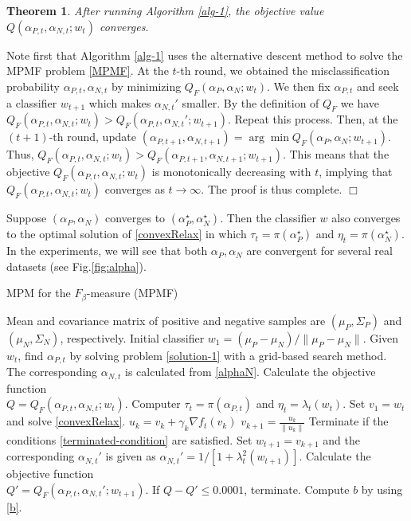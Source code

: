 \documentclass[15pt]{article}
\newtheorem{theorem}{Theorem}
\newenvironment{proof}{{\em Proof.}}{$\Box$}
\begin{document}
\begin{theorem}\label{the:covmpmf}
After running Algorithm \ref{alg-1}, the objective value $Q(\alpha_{P,t},\alpha_{N,t};w_t)$ converges.
\end{theorem}

\begin{proof}
Note first that Algorithm \ref{alg-1} uses the alternative descent method to solve the MPMF problem \eqref{MPMF}.
At the $t$-th round, we obtained the misclassification probability $\alpha_{P,t},\alpha_{N,t}$
by minimizing $Q_F(\alpha_{P},\alpha_{N};w_t)$. We then fix $\alpha_{P,t}$ and seek a classifier $w_{t+1}$
which makes $\alpha_{N,t}'$ smaller. By the definition of $Q_F$ we have
$Q_F(\alpha_{P,t},\alpha_{N,t};w_t)>Q_F(\alpha_{P,t},\alpha_{N,t}'; w_{t+1})$.
Repeat this process. Then, at the $(t+1)$-th round, update
$(\alpha_{P,t+1},\alpha_{N,t+1})=\arg\min Q_F(\alpha_{P},\alpha_{N};w_{t+1})$.
Thus, $Q_F(\alpha_{P,t},\alpha_{N,t};w_t)>Q_F(\alpha_{P,t+1},\alpha_{N,t+1};w_{t+1})$.
This means that the objective $Q_F(\alpha_{P,t},\alpha_{N,t};w_t)$ is monotonically decreasing with $t$,
implying that $Q_F(\alpha_{P,t},\alpha_{N,t};w_t)$ converges as $t\to\infty$.
The proof is thus complete.
\end{proof}

Suppose $(\alpha_P,\alpha_N)$ converges to $(\alpha_P^\star,\alpha_N^\star)$. Then the classifier $w$ also 
converges to the optimal solution of \eqref{convexRelax} in which $\tau_t = \pi(\alpha_P^\star)$ and 
$\eta_t=\pi(\alpha_N^\star)$.
In the experiments, we will see that both $\alpha_P,\alpha_N$ are convergent for several real datasets 
(see Fig.\ref{fig:alpha}).

\begin{algorithm}[tb]
\caption{MPM for the $F_\beta$-measure (MPMF)}\label{alg-1}
\begin{algorithmic}[1]
    Mean and covariance matrix of positive and negative samples are 
          $(\mu_P,\Sigma_P)$ and $(\mu_N,\Sigma_N)$, respectively. 
          Initial classifier $w_1=({\mu_P-\mu_N})/{\|\mu_P-\mu_N\|}$.
   \STATE Given $w_t$, find $\alpha_{P,t}$ by solving problem \eqref{solution-1} with a grid-based search method. 
   The corresponding $\alpha_{N,t}$ is calculated from \eqref{alphaN}.
   \STATE Calculate the objective function \\ $Q = Q_F(\alpha_{P,t},\alpha_{N,t};w_{t})$.
   \STATE Computer $\tau_t=\pi(\alpha_{P,t})$ and $\eta_t=\lambda_t(w_t)$.
   \STATE Set $v_1=w_t$ and solve \eqref{convexRelax}.
   \STATE $u_k=v_k+\gamma_k\nabla f_{t}(v_k)$
   \STATE $v_{k+1}=\frac{u_k}{\|u_k\|}$
   \STATE Terminate if the conditions \eqref{terminated-condition} are satisfied.
   \ENDFOR
   \STATE Set $w_{t+1} = v_{k+1}$ and the corresponding $\alpha_{N,t}'$ is given as $\alpha_{N,t}' = {1}/[{1+\lambda_t^2(w_{t+1})}]$.
   \STATE Calculate the objective function \\ $Q' = Q_F(\alpha_{P,t},\alpha_{N,t}';w_{t+1})$.
   \STATE If $Q-Q'\le 0.0001$, terminate.
   \ENDFOR
   \STATE Compute $b$ by using \eqref{b}.
\end{algorithmic}
\end{algorithm}
\end{document}
